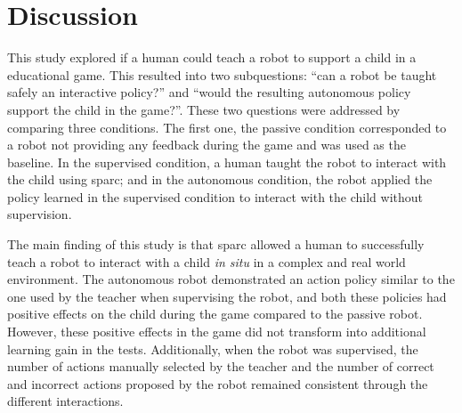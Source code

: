 %
%


\section{Discussion} \label{sec:tutoring_discussion}

This study explored if a human could teach a robot to support a child in a educational game. This resulted into two subquestions: ``can a robot be taught safely an interactive policy?'' and ``would the resulting autonomous policy support the child in the game?''. These two questions were addressed by comparing three conditions. The first one, the passive condition corresponded to a robot not providing any feedback during the game and was used as the baseline. In the supervised condition, a human taught the robot to interact with the child using \gls{sparc}; and in the autonomous condition, the robot applied the policy learned in the supervised condition to interact with the child without supervision.

The main finding of this study is that \gls{sparc} allowed a human to successfully teach a robot to interact with a child \textit{in situ} in a complex and real world environment. The autonomous robot demonstrated an action policy similar to the one used by the teacher when supervising the robot, and both these policies had positive effects on the child during the game compared to the passive robot. However, these positive effects in the game did not transform into additional learning gain in the tests. Additionally, when the robot was supervised, the number of actions manually selected by the teacher and the number of correct and incorrect actions proposed by the robot remained consistent through the different interactions.

